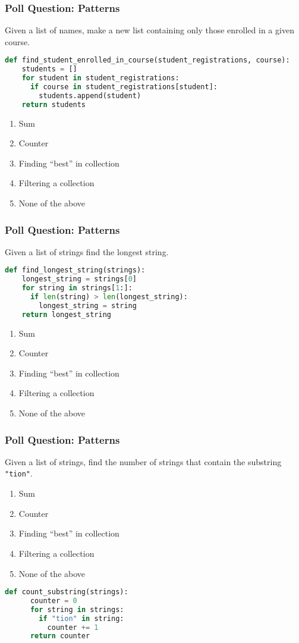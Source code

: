 \documentclass{beamer}
\begin{document}
%
%
\begin{frame}[fragile]
  \frametitle{Poll Question: Patterns}
  Given a list of names, make a new list containing only those enrolled in a given course.
  \begin{lstlisting}[language=Python, autogobble]
  def find_student_enrolled_in_course(student_registrations, course):
    students = []
    for student in student_registrations:
      if course in student_registrations[student]:
        students.append(student)
    return students
  \end{lstlisting}
  \begin{enumerate}[A]
    \item Sum
    \item Counter
    \item Finding ``best'' in collection
    \item Filtering a collection
    \item None of the above
  \end{enumerate}
\end{frame}

%
%
\begin{frame}[fragile]
  \frametitle{Poll Question: Patterns}
  Given a list of strings find the longest string.
  \begin{lstlisting}[language=Python, autogobble]
  def find_longest_string(strings):
    longest_string = strings[0]
    for string in strings[1:]:
      if len(string) > len(longest_string):
        longest_string = string
    return longest_string
  \end{lstlisting}
  \vfill
  \begin{enumerate}[A]
    \item Sum
    \item Counter
    \item Finding ``best'' in collection
    \item Filtering a collection
    \item None of the above
  \end{enumerate}
\end{frame}

%
%
\begin{frame}[fragile]
  \frametitle{Poll Question: Patterns}
  Given a list of strings, find the number of strings that contain the substring \lstinline|"tion"|.
  \begin{enumerate}[A]
    \item Sum
    \item Counter
    \item Finding ``best'' in collection
    \item Filtering a collection
    \item None of the above
  \end{enumerate}
  \vfill
  \begin{lstlisting}[language=Python, autogobble]
    def count_substring(strings):
      counter = 0
      for string in strings:
        if "tion" in string:
          counter += 1
      return counter
  \end{lstlisting}
\end{frame}
\end{document}
